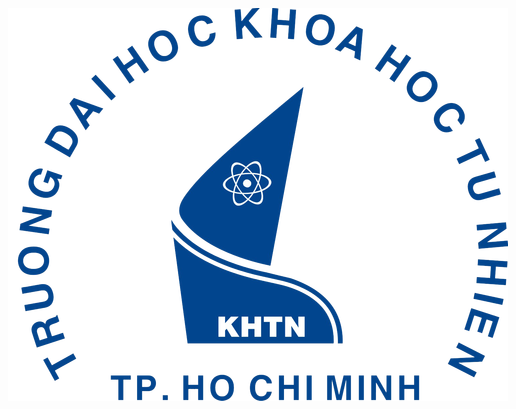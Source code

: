 \documentclass[12pt, final]{article}
\begin{document}
\begin{titlepage}




\includegraphics{logo/rsz_3logo-khtn.png}\\[1cm] %
 

\vspace*{\fill} %

\end{titlepage}

\renewcommand*\contentsname{Mục lục}
\tableofcontents
\end{document}
